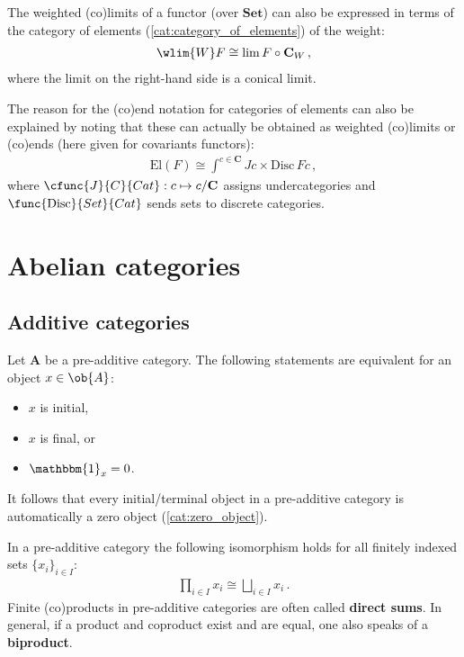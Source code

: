     \begin{property}
        The weighted (co)limits of a functor (over $\mathbf{Set}$) can also be expressed in terms of the category of elements (\cref{cat:category_of_elements}) of the weight:
        \begin{gather}
            \wlim{W}F\cong\lim F\circ\mathbf{C}_W\,,
        \end{gather}
        where the limit on the right-hand side is a conical limit.

        The reason for the (co)end notation for categories of elements can also be explained by noting that these can actually be obtained as weighted (co)limits or (co)ends (here given for covariants functors):
        \begin{gather}
            \mathrm{El}(F) \cong \int^{c\in\mathbf{C}}Jc\times\mathrm{Disc}\,Fc\,,
        \end{gather}
        where $\cfunc{J}{C}{Cat}:c\mapsto c/\mathbf{C}$ assigns undercategories and $\func{\mathrm{Disc}}{Set}{Cat}$ sends sets to discrete categories.
    \end{property}

\section{Abelian categories}\label{section:abelian_categories}
\subsection{Additive categories}


    \begin{property}
        Let $\mathbf{A}$ be a pre-additive category. The following statements are equivalent for an object $x\in\ob{A}$:
        \begin{itemize}
            \item $x$ is initial,
            \item $x$ is final, or
            \item $\mathbbm{1}_x = 0$.
        \end{itemize}
        It follows that every initial/terminal object in a pre-additive category is automatically a zero object (\cref{cat:zero_object}).
    \end{property}
    \begin{property}[Biproducts]
        In a pre-additive category the following isomorphism holds for all finitely indexed sets $\{x_i\}_{i\in I}$:
        \begin{gather}
            \prod_{i\in I}x_i\cong\bigsqcup_{i\in I}x_i\,.
        \end{gather}
        Finite (co)products in pre-additive categories are often called \textbf{direct sums}. In general, if a product and coproduct exist and are equal, one also speaks of a \textbf{biproduct}.
    \end{property}

